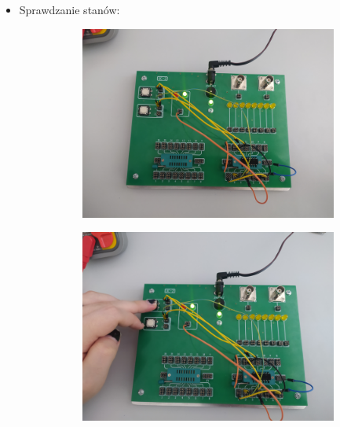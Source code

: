 \begin{itemize}
            \item Sprawdzanie stanów:
                \begin{figure}[H]
                    \centering
                        \begin{subfigure}[h]{0.4\textwidth}
                            \includegraphics[width=\textwidth]{img/NOR/funkcje/1652306732408_scaled.png}
                        \end{subfigure}
                        \begin{subfigure}[h]{0.4\textwidth}
                            \includegraphics[width=\textwidth]{img/NOR/funkcje/1652306732399_scaled.png}
                        \end{subfigure}

\end{figure}
\end{itemize}
